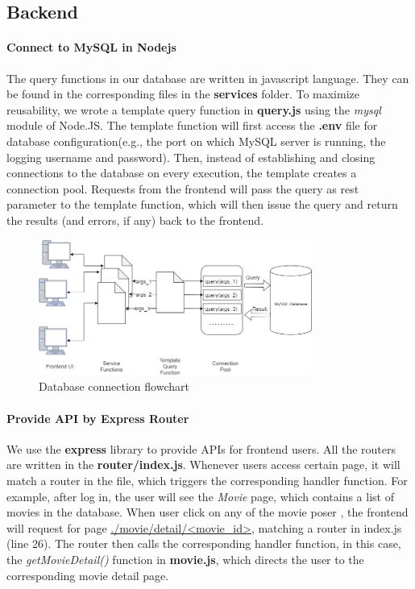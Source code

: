 \begin{CJK*}{UTF8}{gbsn}
\subsection{Backend}
\paragraph{Connect to MySQL in Nodejs}
The query functions in our database are written in javascript language. They can be found in the corresponding files in the \textbf{services} folder. To maximize reusability, we wrote a template query function in \textbf{query.js} using the \textit{mysql} module of Node.JS. The template function will first access the \textbf{.env} file for database configuration(e.g., the port on which MySQL server is running, the logging username and password). Then, instead of establishing and closing connections to the database on every execution, the template creates a connection pool. Requests from the frontend will pass the query as rest parameter to the template function, which will then issue the query and return the results (and errors, if any) back to the frontend.
\begin{figure}[h]
    \label{moviePage}
    \centering
    \includegraphics[width=0.8\textwidth]{sqlconnect.png}
    \caption{Database connection flowchart}
\end{figure}
\paragraph{Provide API by Express Router}
We use the \textbf{express} library to provide APIs for frontend users. All the routers are written in the \textbf{router/index.js}. Whenever users access certain page, it will match a router in the file, which triggers the corresponding handler function. For example, after log in, the user will see the \textit{Movie} page, which contains a list of movies in the database. When user click on any of the movie poser , the frontend will request for page \underline{./movie/detail/<movie_id>}, matching a router in index.js (line 26). The router then calls the corresponding handler function, in this case, the \textit{getMovieDetail()} function in \textbf{movie.js}, which directs the user to the corresponding movie detail page.

\end{CJK*}
